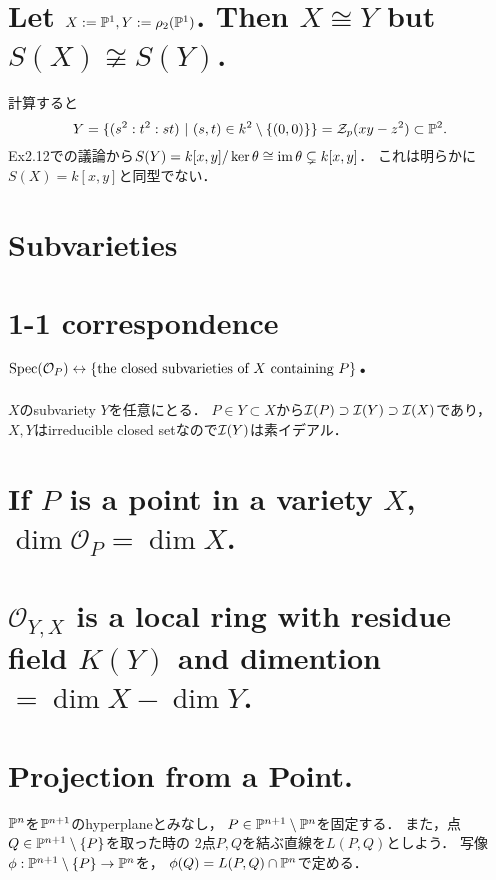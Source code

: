 \documentclass[a4paper]{jarticle}
\begin{document}
\section{Let $X:=\mathbb{P}^1, Y:=\rho_2(\mathbb{P}^1)$. Then $X \cong Y$ but $S(X) \not \cong S(Y)$. } 
    計算すると
    \[ Y=\{(s^2:t^2:st) ~|~ (s,t) \in k^2 \setminus \{(0,0)\} \}=\mathcal{Z}_p(xy-z^2) \subset \mathbb{P}^2.\]
    Ex2.12での議論から$S(Y)=k[x,y]/\ker \theta \cong \operatorname{im} \theta \subsetneq k[x,y]$．
    これは明らかに$S(X)=k[x,y]$と同型でない．

\section{Subvarieties} 

\section{1-1 correspondence \\ $\operatorname{Spec}(\mathcal{O}_P) \leftrightarrow \{\text{the closed subvarieties of $X$ containing $P$}\}$.} 
    $X$のsubvariety $Y$を任意にとる．    
    $P \in Y \subset X$から$\mathcal{I}(P) \supset \mathcal{I}(Y) \supset \mathcal{I}(X)$であり，
    $X, Y$はirreducible closed setなので$\mathcal{I}(Y)$は素イデアル．

\section{If $P$ is a point in a variety $X$, $\dim \mathcal{O}_P=\dim X$.} 

\section{$\mathcal{O}_{Y,X}$ is a local ring with residue field $K(Y)$ and dimention $=\dim X-\dim Y$.} 
    

\section{Projection from a Point.}
    $\mathbb{P}^n$を$\mathbb{P}^{n+1}$のhyperplaneとみなし，
    $P \in \mathbb{P}^{n+1} \setminus \mathbb{P}^n$を固定する．
    また，点$Q \in \mathbb{P}^{n+1} \setminus \{P\}$を取った時の
    2点$P,Q$を結ぶ直線を$L(P,Q)$としよう．
    写像$\phi: \mathbb{P}^{n+1} \setminus \{P\} \to \mathbb{P}^n$を，
    $\phi(Q)=L(P,Q) \cap \mathbb{P}^n$で定める．
\end{document}
